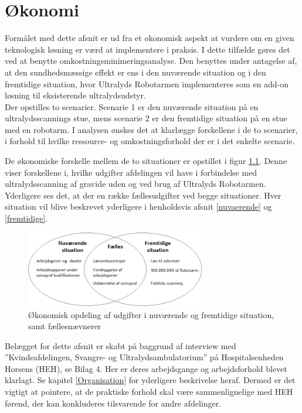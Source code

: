 \chapter{Økonomi} \label{Okonomi}
Formålet med dette afsnit er ud fra et økonomisk aspekt at vurdere om en given teknologisk løsning er værd at implementere i praksis. I dette tilfælde gøres det ved at benytte omkostningsminimeringsanalyse. Den benyttes under antagelse af, at den sundhedsmæssige effekt er ens i den nuværende situation og i den fremtidige situation, hvor Ultralyds Robotarmen implementeres som en add-on løsning til eksisterende ultralydsudstyr. \\
Der opstilles to scenarier. Scenarie 1 er den nuværende situation på en ultralydsscannings stue, mens scenarie 2 er den fremtidige situation på en stue med en robotarm. I analysen ønskes det at klarlægge forskellene i de to scenarier, i forhold til hvilke ressource- og omkostningsforhold der er i det enkelte scenarie. 

De økonomiske forskelle mellem de to situationer er opstillet i figur \ref{ModelOkonomi}. Denne viser forskellene i, hvilke udgifter afdelingen vil have i forbindelse med ultralydsscanning af gravide uden og ved brug af Ultralyds Robotarmen. Yderligere ses det, at der en række fællesudgifter ved begge situationer. Hver situation vil blive beskrevet yderligere i henholdsvis afsnit \ref{nuvaerende} og \ref{fremtidige}. 

\begin{figure}[H]\centering
	\includegraphics[width = 0.7\textwidth]{Figurer/ModelOkonomi}
	\caption{Økonomisk opdeling af udgifter i nuværende og fremtidige situation, samt fællesnævnerer}
	\label{ModelOkonomi}
\end{figure}

Belægget for dette afsnit er skabt på baggrund af interview med ”Kvindeafdelingen, Svangre- og Ultralydsambulatorium” på Hospitalsenheden Horsens (HEH), se Bilag 4. Her er deres arbejdsgange og arbejdsforhold blevet klarlagt. Se kapitel \ref{Organisation} for yderligere beskrivelse heraf. Dermed er det vigtigt at pointere, at de praktiske forhold skal være sammenlignelige med HEH førend, der kan konkluderes tilsvarende for andre afdelinger.

